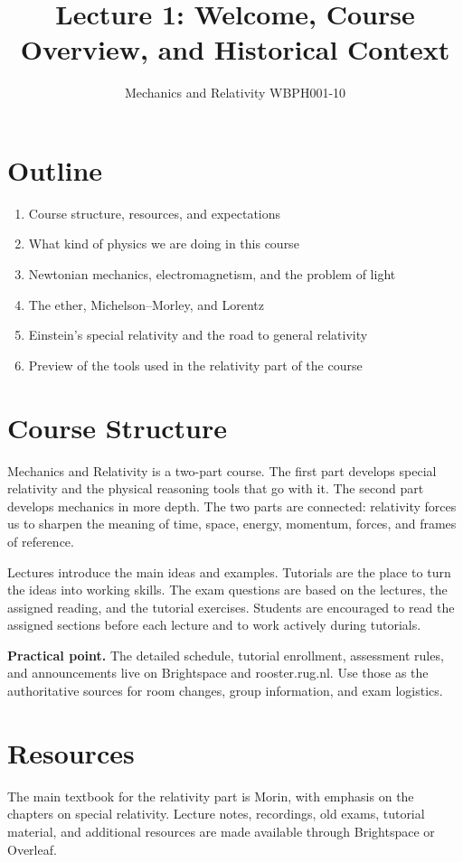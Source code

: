 \documentclass[12pt]{article}
\title{\textbf{Lecture 1: Welcome, Course Overview, and Historical Context}}
\author{Mechanics and Relativity WBPH001-10}
\date{}
\begin{document}
\maketitle

\section*{Outline}
\begin{enumerate}
    \item Course structure, resources, and expectations
    \item What kind of physics we are doing in this course
    \item Newtonian mechanics, electromagnetism, and the problem of light
    \item The ether, Michelson--Morley, and Lorentz
    \item Einstein's special relativity and the road to general relativity
    \item Preview of the tools used in the relativity part of the course
\end{enumerate}

\section{Course Structure}
Mechanics and Relativity is a two-part course. The first part develops special relativity and the physical reasoning tools that go with it. The second part develops mechanics in more depth. The two parts are connected: relativity forces us to sharpen the meaning of time, space, energy, momentum, forces, and frames of reference.

Lectures introduce the main ideas and examples. Tutorials are the place to turn the ideas into working skills. The exam questions are based on the lectures, the assigned reading, and the tutorial exercises. Students are encouraged to read the assigned sections before each lecture and to work actively during tutorials.

\begin{tcolorbox}[colback=blue!5!white]
\textbf{Practical point.} The detailed schedule, tutorial enrollment, assessment rules, and announcements live on Brightspace and rooster.rug.nl. Use those as the authoritative sources for room changes, group information, and exam logistics.
\end{tcolorbox}

\section{Resources}
The main textbook for the relativity part is Morin, with emphasis on the chapters on special relativity. Lecture notes, recordings, old exams, tutorial material, and additional resources are made available through Brightspace or Overleaf.
\end{document}
